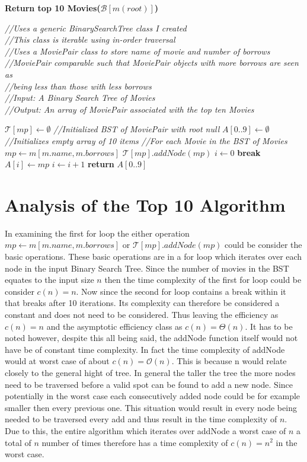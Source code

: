 \documentclass[a4paper,12pt]{article}
\begin{document}
\begin{algorithm}
\caption{\textbf{Return top 10 Movies($ \mathcal B[m(root)]$)}}
\emph{//Uses a generic BinarySearchTree class I created}\\
\emph{//This class is iterable using in-order traversal}\\
\emph{//Uses a MoviePair class to store name of movie and number of borrows}\\
\emph{//MoviePair comparable such that MoviePair objects with more borrows are seen as}\\
\emph{//being less than those with less borrows}\\
\emph{//Input: A Binary Search Tree of Movies}\\
\emph{//Output: An array of MoviePair associated with the top ten Movies}
\begin{algorithmic}[1]
\State $\mathcal T[mp] \leftarrow \emptyset $ \emph{//Initialized BST of MoviePair with root null}
\State $A[0..9] \leftarrow \emptyset$ \emph{//Initializes empty array of 10 items}
 \emph{//For each Movie in the BST of Movies}
	\State $mp \leftarrow m[m.name, m.borrows]$ 
	\State $ \mathcal T[mp].addNode(mp)$
\EndFor
\State $i \leftarrow 0$
		\State \textbf{break}
	\EndIf
	\State $A[i] \leftarrow mp$
	\State $i \leftarrow i + 1$
\EndFor
\State \textbf{return} $A[0..9]$
\end{algorithmic}
\end{algorithm}
\section{Analysis of the Top 10 Algorithm}
In examining the first for loop the either operation $mp \leftarrow m[m.name, m.borrows]$ or $ \mathcal T[mp].addNode(mp)$ could be consider the basic operations. These basic operations are in a for loop which iterates over each node in the input Binary Search Tree. Since the number of movies in the BST equates to the input size $n$ then the time complexity of the first for loop could be consider $c(n) = n$. Now since the second for loop contains a break within it that breaks after 10 iterations. Its complexity can therefore be considered a constant and does not need to be considered. Thus leaving the efficiency as $c(n) = n$ and the asymptotic efficiency class as $c(n) = \Theta(n)$. It has to be noted however, despite this all being said, the addNode function itself would not have be of constant time complexity. In fact the time complexity of addNode would at worst case of about $c(n) = \mathcal{O}(n)$. This is because n would relate closely to the general hight of tree. In general the taller the tree the more nodes need to be traversed before a valid spot can be found to add a new node. Since potentially in the worst case each consecutively added node could be for example smaller then every previous one. This situation would result in every node being needed to be traversed every add and thus result in the time complexity of $n$. Due to this, the entire algorithm which iterates over addNode a worst case of $n$ a total of $n$ number of times therefore has a time complexity of $c(n) = n^2$ in the worst case.
\end{document}
